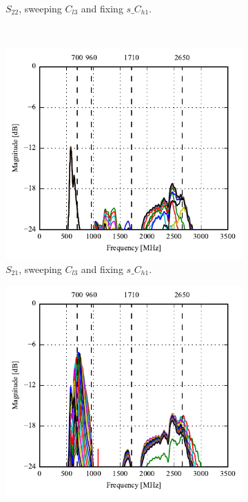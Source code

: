 \begin{figure}[htbp]
\begin{subfigure}[b]{0.49\linewidth}
        \caption{$S_{22}$, sweeping $C_{l3}$ and fixing $s\_C_{h1}$.}
    \end{subfigure}
    \\
    \begin{subfigure}[b]{0.49\linewidth}
        \centering
        \includegraphics{img/tech_sol/nonresonant/simulation/data_mode/s12_top_sweep.pdf}
        \caption{$S_{21}$, sweeping $C_{l3}$ and fixing $s\_C_{h1}$.}
    \end{subfigure}
    \hfill
    \begin{subfigure}[b]{0.49\linewidth}
        \centering
        \includegraphics{img/tech_sol/nonresonant/simulation/data_mode/s21_side_sweep.pdf}

\end{subfigure}
\end{figure}
